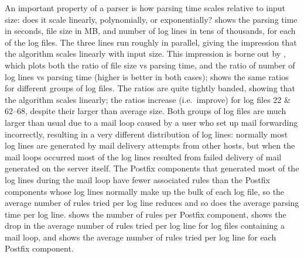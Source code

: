 An important property of a parser is how parsing time scales relative to
input size: does it scale linearly, polynomially, or exponentially?
 shows the
parsing time in seconds, file size in MB, and number of log lines in tens
of thousands, for each of the \numberOFlogFILES{} log files.  The three
lines run roughly in parallel, giving the impression that the algorithm
scales linearly with input size.  This impression is borne out by
, which
plots both the ratio of file size vs parsing time, and the ratio of number
of log lines vs parsing time (higher is better in both cases);
shows the same ratios for different groups of log files.  The ratios are
quite tightly banded, showing that the algorithm scales linearly; the
ratios increase (i.e.\ improve) for log files 22 \& 62--68, despite their
larger than average size.  Both groups of log files are much larger than
usual due to a mail loop caused by a user who set up mail forwarding
incorrectly, resulting in a very different distribution of log lines:
normally most log lines are generated by mail delivery attempts from other
hosts, but when the mail loops occurred most of the log lines resulted from
failed delivery of mail generated on the server itself.  The Postfix
components that generated most of the log lines during the mail loop have
fewer associated rules than the Postfix components whose log lines normally
make up the bulk of each log file, so the average number of rules tried per
log line reduces and so does the average parsing time per log line.
 shows the number of rules
per Postfix component,  shows the drop in the average number of rules tried per log line for
log files containing a mail loop, and  shows the average number of
rules tried per log line for each Postfix component.



